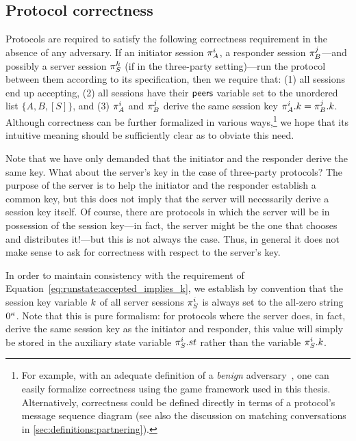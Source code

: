 \subsection{Protocol correctness}\label{sec:definitions:protocol_correctness}
Protocols are required to satisfy the following correctness requirement in the absence of any adversary.
If an initiator session $\oracle[A][i]$,
a responder session $\oracle[B][j]$---and possibly a server session $\oracle[S][k]$
(if in the three-party setting)---run 
the protocol between them according to its specification,
then we require that: (1) all sessions end up accepting,
(2) all sessions have their $\mathsf{peers}$ variable set to the unordered list $\lbrace A, B, [S] \rbrace$,
and (3) $\oracle[A][i]$ and $\oracle[B][j]$ derive the same session key $\oracle[A][i].\key = \oracle[B][j].\key$.
Although correctness can be further formalized in various ways,\footnote{For example,
with an adequate definition of a \emph{benign} adversary~\cite{STOC:BelRog95},
one can easily formalize correctness using the game framework used in this thesis.
Alternatively,
correctness could be defined directly in terms of a protocol's message sequence diagram
(see also the discussion on matching conversations in \cref{sec:definitions:partnering}).
}
we hope that its intuitive meaning should be sufficiently clear as to obviate this need.

 
Note that we have only demanded that the initiator and the responder derive the same key.
What about the server's key in the case of three-party protocols?
The purpose of the server is to help the initiator and the responder establish a common key,
but this does not imply that the server will necessarily derive a session key itself.
Of course,
there are protocols in which the server will be in possession of the session key---in fact,
the server might be the one that chooses and distributes it!---but this is not always the case.
Thus, in general it does not make sense to ask for correctness with respect to the server's key.

In order to maintain consistency with the requirement of Equation~\eqref{eq:runstate:accepted_implies_k},
we establish by convention that the session key variable $k$ of all server sessions $\oracle[S][i]$ is always set to the all-zero string $0^\kappa$.
Note that this is pure formalism:
for protocols where the server does,
in fact,
derive the same session key as the initiator and responder,
this value will simply be stored in the auxiliary state variable $\oracle[S][i].\st$ rather than the variable $\oracle[S][i].\key$. 



